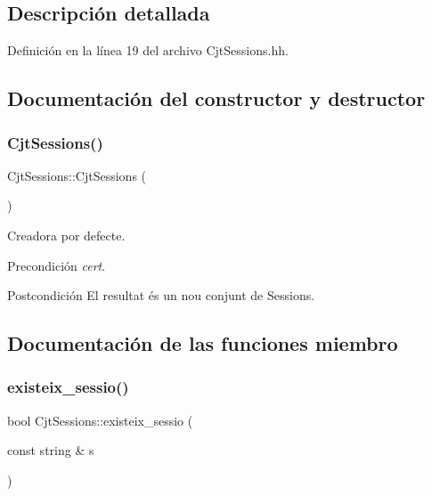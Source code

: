 \subsection{Descripción detallada}


Definición en la línea 19 del archivo Cjt\+Sessions.\+hh.



\subsection{Documentación del constructor y destructor}
\mbox{\label{class_cjt_sessions_acfe3023a40e3dcbfeb558466a013ca87}} 
\subsubsection{\texorpdfstring{Cjt\+Sessions()}{CjtSessions()}}
{\footnotesize\ttfamily Cjt\+Sessions\+::\+Cjt\+Sessions (\begin{DoxyParamCaption}{ }\end{DoxyParamCaption})}



Creadora por defecte. 

\begin{DoxyPrecond}{Precondición}
{\itshape cert}. 
\end{DoxyPrecond}
\begin{DoxyPostcond}{Postcondición}
El resultat és un nou conjunt de Sessions. 
\end{DoxyPostcond}


\subsection{Documentación de las funciones miembro}
\mbox{\label{class_cjt_sessions_ae9df08981044710d4343da21c44e9f1b}} 
\subsubsection{\texorpdfstring{existeix\+\_\+sessio()}{existeix\_sessio()}}
{\footnotesize\ttfamily bool Cjt\+Sessions\+::existeix\+\_\+sessio (\begin{DoxyParamCaption}\item[{const string \&}]{s }\end{DoxyParamCaption})}



